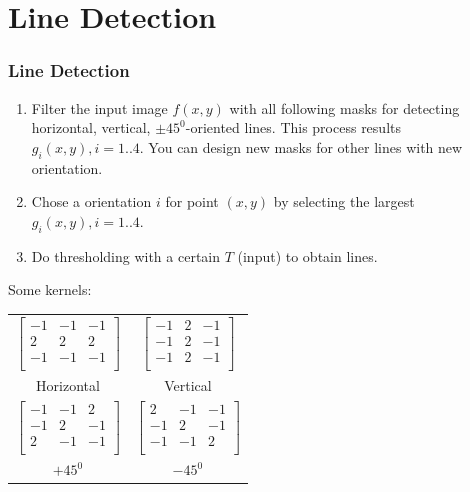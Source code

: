\documentclass[english,11pt,table,handout]{beamer}
\begin{document}
\section{Line Detection}
\frame
{
	\frametitle{Line Detection}
	\begin{enumerate}
		\item Filter the input image $f(x,y)$ with all following masks for detecting horizontal, vertical, $\pm 45^0$-oriented lines. This process results $g_{i}(x,y), i=1..4$. You can design new masks for other lines with new orientation.
		\item Chose a orientation $i$ for point $(x,y)$ by selecting the largest $g_{i}(x,y), i=1..4$.
		\item Do thresholding with a certain $T$ (input) to obtain lines.
	\end{enumerate}
	
	Some kernels:

	\centering
	
	\begin{tabular}{c|c}
		$
		\left[
		\begin{array}{rrr}
		-1 & -1 & -1 \\ 
		2 & 2 & 2 \\
		-1 & -1 & -1 \\
		\end{array}
		\right]
		$ &
		$
		\left[
		\begin{array}{rrr}
		-1 & 2 & -1 \\ 
		-1 & 2 & -1 \\
		-1 & 2 & -1 \\
		\end{array}
		\right]
		$
		\\
		Horizontal & Vertical 
		\\
		\hline
		$
		\left[
		\begin{array}{rrr}
		-1 & -1 & 2 \\ 
		-1 & 2 & -1 \\
		2 & -1 & -1 \\
		\end{array}
		\right]
		$ &
		$
		\left[
		\begin{array}{rrr}
		2 & -1 & -1 \\ 
		-1 & 2 & -1 \\
		-1 & -1 & 2 \\
		\end{array}
		\right]
		$ 
		\\
		$+45^0$ & $-45^0$ 
		\\
		
	\end{tabular}
}
\end{document}
